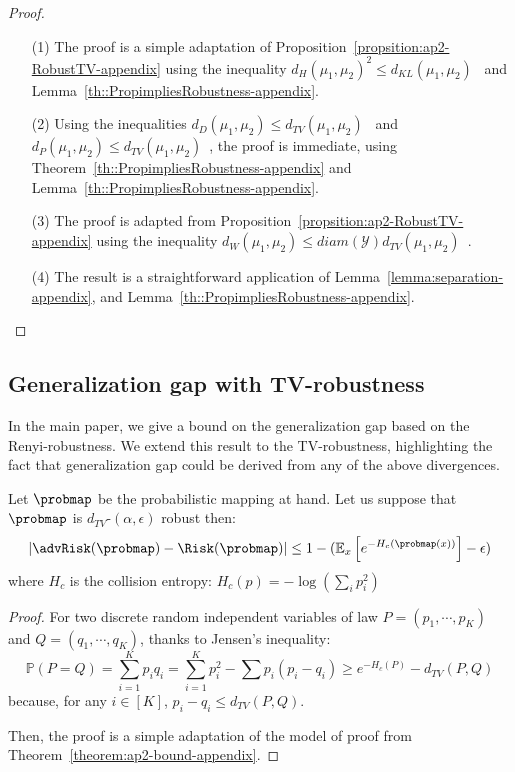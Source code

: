 \begin{proof}
\begin{itemize}
\item[ ]
\item[(1)] The proof is a simple adaptation of Proposition~\ref{propsition:ap2-RobustTV-appendix} using the inequality $d_H(\mu_1,\mu_2)^{2} \leq d_{KL}(\mu_1,\mu_2)$~\cite{AGibbsMetrics2002} and Lemma~\ref{th::PropimpliesRobustness-appendix}.\\
\item[(2)] Using the inequalities  $d_D(\mu_1,\mu_2) \leq d_{TV}(\mu_1,\mu_2)$~\cite{AGibbsMetrics2002} and  $d_P(\mu_1,\mu_2) \leq d_{TV}(\mu_1,\mu_2)$~\cite{huber2011robust}, the proof is immediate, using Theorem~\ref{th::PropimpliesRobustness-appendix} and Lemma~\ref{th::PropimpliesRobustness-appendix}.
\item[(3)] The proof is adapted from Proposition~\ref{propsition:ap2-RobustTV-appendix} using the inequality $d_W(\mu_1,\mu_2) \leq diam(\mathcal{Y}) d_{TV}(\mu_1,\mu_2)$~\cite{AGibbsMetrics2002}.
\item[(4)]The result is a straightforward application of Lemma~\ref{lemma:separation-appendix}, and Lemma~\ref{th::PropimpliesRobustness-appendix}.
\end{itemize}
\end{proof}


\subsection{Generalization gap with TV-robustness}

In the main paper, we give a bound on the generalization gap based on the Renyi-robustness. We extend this result to the TV-robustness, highlighting the fact that generalization gap could be derived from any of the above divergences.

\begin{theorem}

\label{theorem:ap2-boundTV-appendix}
Let $\probmap$ be the probabilistic mapping at hand. Let us suppose that  $\probmap$ is $d_{TV}$-$(\alpha,\epsilon)$ robust then:
$$|\advRisk(\probmap)-\Risk(\probmap)|\leq 1-(\mathbb{E}_x\left[e^{-H_c(\probmap(x))}\right]-\epsilon)$$
where $H_c$ is the collision entropy: $H_c(p)=-\log(\sum_i p_i^2)$
\end{theorem}
\begin{proof}
For two discrete random independent variables of law $P=(p_1, \cdots ,p_K)$ and $Q=(q_1, \cdots ,q_K)$, thanks to Jensen's inequality: 
$$\mathbb{P}(P=Q)=\sum_{i=1}^K p_i q_i=\sum_{i=1}^K p_i^2-\sum p_i(p_i-q_i)\geq e^{-H_c(P)}-d_{TV}(P,Q)$$
because, for any $i \in [K]$, $p_i-q_i\leq d_{TV}(P,Q)$.

Then, the proof is a simple adaptation of the model of proof from Theorem~\ref{theorem:ap2-bound-appendix}.
\end{proof}


